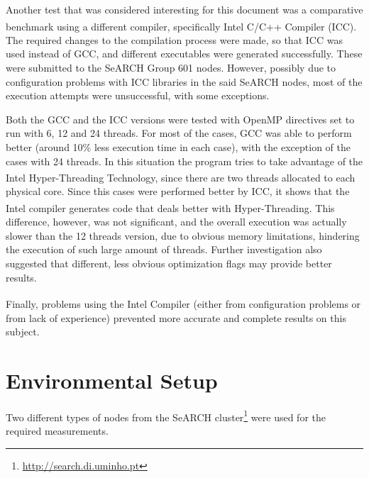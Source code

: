 \documentclass[abstract=on,9pt,twocolumn]{scrartcl}
\begin{document}
Another test that was considered interesting for this document was a comparative benchmark using a different compiler, specifically Intel\textsuperscript{\textregistered} C/C++ Compiler (ICC). The required changes to the compilation process were made, so that ICC was used instead of GCC, and different executables were generated successfully. These were submitted to the SeARCH Group 601 nodes. However, possibly due to configuration problems with ICC libraries in the said SeARCH nodes, most of the execution attempts were unsuccessful, with some exceptions.%

Both the GCC and the ICC versions were tested with OpenMP directives set to run with 6, 12 and 24 threads. For most of the cases, GCC was able to perform better (around 10\% less execution time in each case), with the exception of the cases with 24 threads. In this situation the program tries to take advantage of the Intel\textsuperscript{\textregistered} Hyper-Threading Technology, since there are two threads allocated to each physical core. Since this cases were performed better by ICC, it shows that the Intel\textsuperscript{\textregistered} compiler generates code that deals better with Hyper-Threading. This difference, however, was not significant, and the overall execution was actually slower than the 12 threads version, due to obvious memory limitations, hindering the execution of such large amount of threads. Further investigation also suggested that different, less obvious optimization flags may provide better results.

Finally, problems using the Intel\textsuperscript{\textregistered} Compiler (either from configuration problems or from lack of experience) prevented more accurate and complete results on this subject.




\appendix
\section{Environmental Setup}
\label{sec:environment}
Two different types of nodes from the SeARCH cluster\footnote{\url{http://search.di.uminho.pt}} were used for the required measurements.
\end{document}
